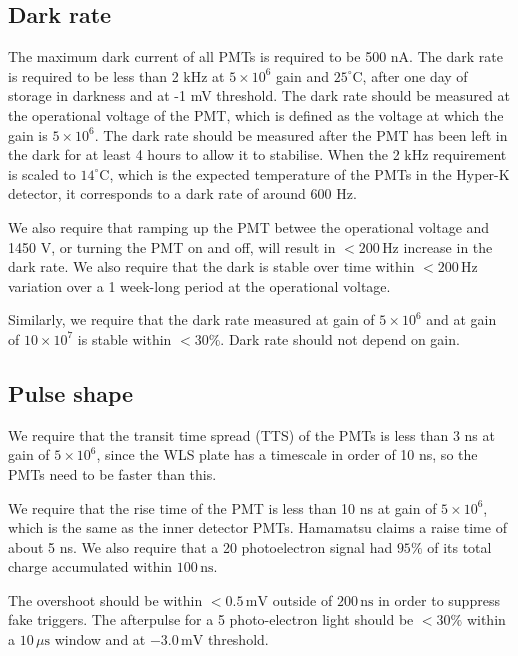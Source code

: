 \documentclass[12pt,a4paper]{article}
\begin{document}
\subsection{Dark rate}

The maximum dark current of all PMTs is required to be 500 nA. The dark rate is required to be less than 2 kHz at $5 \times 10^6$ gain and $25^\circ$C, after one day of storage in darkness and at -1 mV threshold. The dark rate should be measured at the operational voltage of the PMT, which is defined as the voltage at which the gain is $5 \times 10^6$. The dark rate should be measured after the PMT has been left in the dark for at least 4 hours to allow it to stabilise. When the 2 kHz requirement is scaled to $14^\circ$C, which is the expected temperature of the PMTs in the Hyper-K detector, it corresponds to a dark rate of around 600 Hz.

We also require that ramping up the PMT betwee the operational voltage and 1450 V, or turning the PMT on and off, will result in $<200\,\text{Hz}$ increase in the dark rate. We also require that the dark is stable over time within $<200\,\text{Hz}$ variation over a 1 week-long period at the operational voltage.

Similarly, we require that the dark rate measured at gain of $5 \times 10^6$ and at gain of $10\times 10^7$ is stable within $<30\%$. Dark rate should not depend on gain.


\subsection{Pulse shape}
We require that the transit time spread (TTS) of the PMTs is less than 3 ns at gain of $5 \times 10^6$, since the WLS plate has a timescale in order of 10 ns, so the PMTs need to be faster than this.

We require that the rise time of the PMT is less than 10 ns at gain of $5 \times 10^6$, which is the same as the inner detector PMTs. Hamamatsu claims a raise time of about 5 ns. We also require that a 20 photoelectron signal had $95\%$ of its total charge accumulated within $100\,\text{ns}$.

The overshoot should be within $<0.5\,\text{mV}$ outside of $200\,\text{ns}$ in order to suppress fake triggers. The afterpulse for a 5 photo-electron light should be $<30\%$ within a $10\,\mu\text{s}$ window and at $-3.0\,\text{mV}$ threshold.
\end{document}
